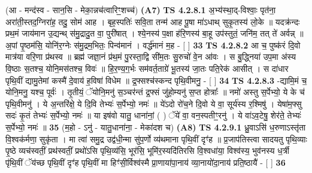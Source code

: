 \documentclass[17pt]{extarticle}
\begin{document}
                      (आ - मन्द॑स्व - सान॒सि - मेका॒न्नच॑त्वारिꣳ॒॒शच्च॑)  \textbf{(A7)} \newline \newline
                                        \textbf{ TS 4.2.8.1} \newline
                  अ॒भ्य॑स्था॒द्-विश्वाः॒ पृत॑ना॒ अरा॑ती॒स्तद॒ग्निरा॑ह॒ तदु॒ सोम॑ आह । बृह॒स्पतिः॑ सवि॒ता तन्म॑ आह पू॒षा मा॑ऽधाथ् सुकृ॒तस्य॑ लो॒के ॥ यदक्र॑न्दः प्रथ॒मं जाय॑मान उ॒द्यन्थ् स॑मु॒द्रादु॒त वा॒ पुरी॑षात् । श्ये॒नस्य॑ प॒क्षा ह॑रि॒णस्य॑ बा॒हू उप॑स्तुतं॒ जनि॑म॒ तत् ते॑ अर्वन्न् ॥ अ॒पां पृ॒ष्ठम॑सि॒ योनि॑र॒ग्नेः स॑मु॒द्रम॒भितः॒ पिन्व॑मानं । वर्द्ध॑मानं म॒ह - [  ] \textbf{  33} \newline
                  \newline
                                \textbf{ TS 4.2.8.2} \newline
                  आ च॒ पुष्क॑रं दि॒वो मात्र॑या वरि॒णा प्र॑थस्व ॥ ब्रह्म॑ जज्ञा॒नं प्र॑थ॒मं पु॒रस्ता॒द्वि सी॑म॒तः सु॒रुचो॑ वे॒न आ॑वः । स बु॒द्ध्निया॑ उप॒मा अ॑स्य वि॒ष्ठाः स॒तश्च॒ योनि॒मस॑तश्च॒ विवः॑ ॥ हि॒र॒ण्य॒ग॒र्भः सम॑वर्त॒ताग्रे॑ भू॒तस्य॑ जा॒तः पति॒रेक॑ आसीत् । स दा॑धार पृथि॒वीं द्यामु॒तेमां कस्मै॑ दे॒वाय॑ ह॒विषा॑ विधेम ॥ द्र॒फ्सश्च॑स्कन्द पृथि॒वीमनु॒ - [  ] \textbf{  34} \newline
                  \newline
                                \textbf{ TS 4.2.8.3} \newline
                  -द्यामि॒मं च॒ योनि॒मनु॒ यश्च॒ पूर्वः॑ । तृ॒तीयं॒ ॅयोनि॒मनु॑ स॒ञ्चर॑न्तं द्र॒फ्सं जु॑हो॒म्यनु॑ स॒प्त होत्राः᳚ ॥ नमो॑ अस्तु स॒र्पेभ्यो॒ ये के च॑ पृथि॒वीमनु॑ । ये अ॒न्तरि॑क्षे॒ ये दि॒वि तेभ्यः॑ स॒र्पेभ्यो॒ नमः॑ ॥ ये॑ऽदो रो॑च॒ने दि॒वो ये वा॒ सूर्य॑स्य र॒श्मिषु॑ । येषा॑म॒फ्सु सदः॑ कृ॒तं तेभ्यः॑ स॒र्पेभ्यो॒ नमः॑ ॥ या इष॑वो यातु॒ धाना॑नां॒ ( ) ॅये॑ वा॒ वन॒स्पतीꣳ॒॒रनु॑ । ये वा॑ऽव॒टेषु॒ शेर॑ते॒ तेभ्यः॑ स॒र्पेभ्यो॒ नमः॑ ॥ \textbf{  35} \newline
                  \newline
                      (म॒हो - ऽनु॑ - यातु॒धाना॑ना॒ - मेका॑दश च)  \textbf{(A8)} \newline \newline
                                        \textbf{ TS 4.2.9.1} \newline
                  ध्रु॒वाऽसि॑ ध॒रुणाऽस्तृ॑ता वि॒श्वक॑र्मणा॒ सुकृ॑ता । मा त्वा॑ समु॒द्र उद्व॑धी॒न्मा सु॑प॒र्णो व्य॑थमाना पृथि॒वीं दृꣳ॑ह ॥ प्र॒जाप॑तिस्त्वा सादयतु पृथि॒व्याः पृ॒ष्ठे व्यच॑स्वतीं॒ प्रथ॑स्वतीं॒ प्रथो॑ऽसि पृथि॒व्य॑सि॒ भूर॑सि॒ भूमि॑र॒स्यदि॑तिरसि वि॒श्वधा॑या॒ विश्व॑स्य॒ भुव॑नस्य ध॒र्त्री पृ॑थि॒वीं ॅय॑च्छ पृथि॒वीं दृꣳ॑ह पृथि॒वीं मा हिꣳ॑सी॒र्विश्व॑स्मै प्रा॒णाया॑पा॒नाय॑ व्या॒नायो॑दा॒नाय॑ प्रति॒ष्ठायै॑ - [  ] \textbf{  36} \newline
\end{document}
